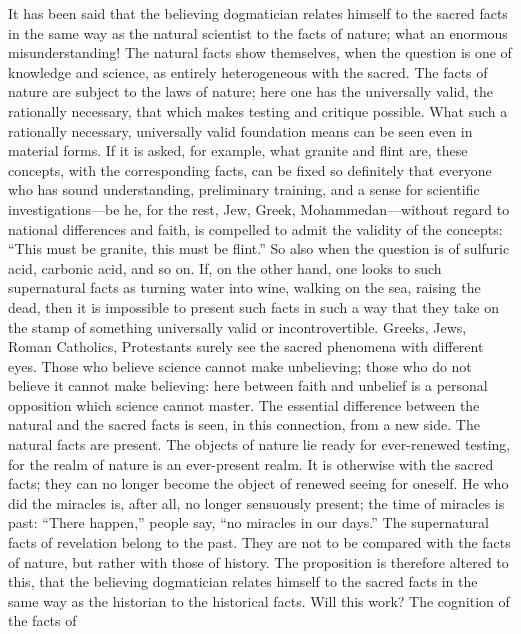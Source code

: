 \documentclass[12pt]{book}
\newcommand{\opage}[1]{\marginnote{\footnotesize\textit{[#1]}}}
\begin{document}
It has been said that the believing dogmatician relates himself to the
sacred facts in the same way as the natural scientist to the facts of
nature; what an enormous misunderstanding! The natural facts show
themselves, when the question is one of knowledge and science, as
entirely heterogeneous with the sacred. The facts of nature are subject
to the laws of nature; here one has the universally valid, the
rationally necessary, that which makes testing and critique possible.
What such a rationally necessary, universally valid foundation means can
be seen
\opage{81}\setcounter{footnote}{0}%
even in material forms. If it is asked, for example, what granite and
flint are, these concepts, with the corresponding facts, can be fixed so
definitely that everyone who has sound understanding, preliminary
training, and a sense for scientific investigations---be he, for the
rest, Jew, Greek, Mohammedan---without regard to national differences
and faith, is compelled to admit the validity of the concepts: ``This
must be granite, this must be flint.'' So also when the question is of
sulfuric acid, carbonic acid, and so on. If, on the other hand, one
looks to such supernatural facts as turning water into wine, walking on
the sea, raising the dead, then it is impossible to present such facts
in such a way that they take on the stamp of something universally valid
or incontrovertible. Greeks, Jews, Roman Catholics, Protestants surely
see the sacred phenomena with different eyes. Those who believe science
cannot make unbelieving; those who do not believe it cannot make
believing: here between faith and unbelief is a personal opposition
which science cannot master. The essential difference between the
natural and the sacred facts is seen, in this connection, from a new
side. The natural facts are present. The objects of nature lie ready for
ever-renewed testing, for the realm of nature is an ever-present realm.
It is otherwise with the sacred facts; they can no longer become the
object of renewed seeing for oneself. He who did the miracles is, after
all, no longer sensuously present; the time of miracles is past:
``There happen,'' people say, ``no miracles in our days.'' The
supernatural facts of revelation belong to the past. They are not to be
compared with the facts of nature, but rather with those of history.
The proposition is therefore altered to this, that the believing
dogmatician
\opage{82}\setcounter{footnote}{0}%
relates himself to the sacred facts in the same way as the historian to
the historical facts. Will this work? The cognition of the facts of
\end{document}
